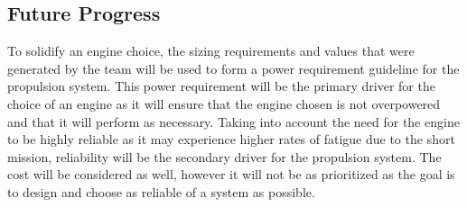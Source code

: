 \subsection{Future Progress}

To solidify an engine choice, the sizing requirements and values that were generated by the team will be used to form a power requirement guideline for the propulsion system. This power requirement will be the primary driver for the choice of an engine as it will ensure that the engine chosen is not overpowered and that it will perform as necessary. Taking into account the need for the engine to be highly reliable as it may experience higher rates of fatigue due to the short mission, reliability will be the secondary driver for the propulsion system. The cost will be considered as well, however it will not be as prioritized as the goal is to design and choose as reliable of a system as possible.



